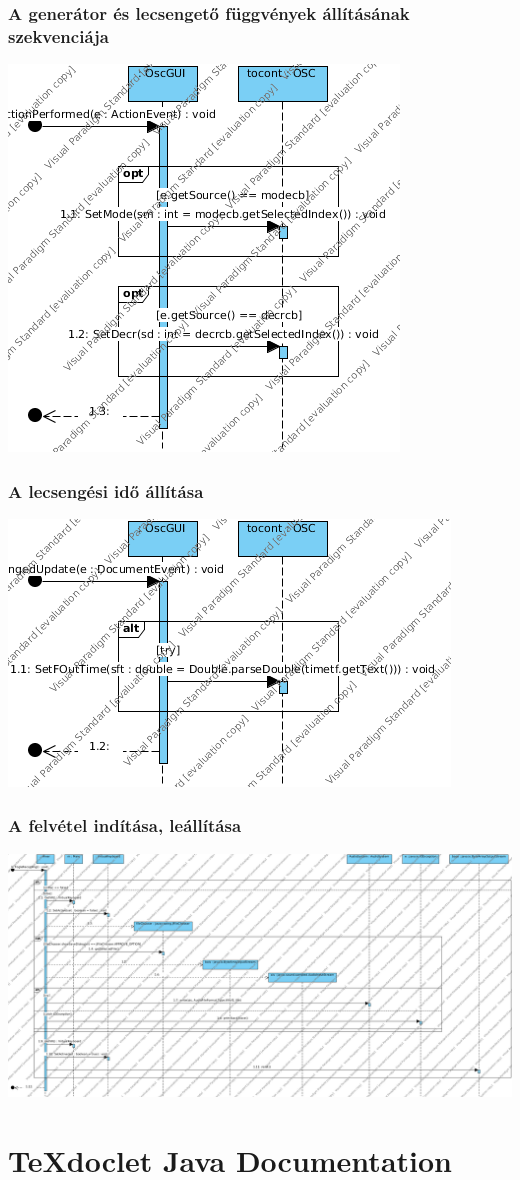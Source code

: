 \documentclass[11pt,a4paper]{report}
\begin{document}
	\subsection{A generátor és lecsengető függvények állításának szekvenciája}
	\includegraphics[scale = 0.9]{genlecs.png} \\
	\subsection{A lecsengési idő állítása}
	\includegraphics[scale = 0.9]{ido.png} \\
	\subsection{A felvétel indítása, leállítása}
	\includegraphics[scale = 0.3]{record.png} \\
	
	
	\chapter{TeXdoclet Java Documentation} {
		
	}
	
\end{document}
